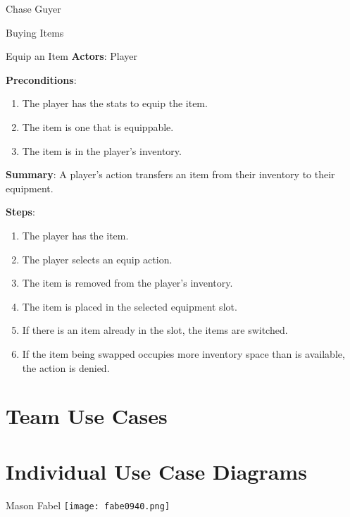 \documentclass[12pt]{report}
\begin{document}
\begin{section}{Chase Guyer}
\begin{subsection}{Buying Items}
\end{subsection}

\begin{subsection}{Equip an Item}
\textbf{Actors}:
Player

\textbf{Preconditions}:
\begin{enumerate}
\item The player has the stats to equip the item.
\item The item is one that is equippable.
\item The item is in the player's inventory.
\end{enumerate}

\textbf{Summary}:
A player's action transfers an item from their inventory to their equipment.

\textbf{Steps}:
\begin{enumerate}
\item The player has the item.
\item The player selects an equip action.
\item The item is removed from the player's inventory.
\item The item is placed in the selected equipment slot.
\item If there is an item already in the slot, the items are switched.
\item If the item being swapped occupies more inventory space than is available,
the action is denied.
\end{enumerate}
\end{subsection}

\end{section}


\chapter{Team Use Cases}


\chapter{Individual Use Case Diagrams}

\begin{section}{Mason Fabel}
\texttt{[image: fabe0940.png]}
\end{section}
\end{document}
